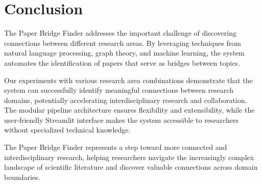 \documentclass[11pt,a4paper]{article}
\begin{document}
\section{Conclusion}

The Paper Bridge Finder addresses the important challenge of discovering connections between different research areas. By leveraging techniques from natural language processing, graph theory, and machine learning, the system automates the identification of papers that serve as bridges between topics.

Our experiments with various research area combinations demonstrate that the system can successfully identify meaningful connections between research domains, potentially accelerating interdisciplinary research and collaboration. The modular pipeline architecture ensures flexibility and extensibility, while the user-friendly Streamlit interface makes the system accessible to researchers without specialized technical knowledge.

The Paper Bridge Finder represents a step toward more connected and interdisciplinary research, helping researchers navigate the increasingly complex landscape of scientific literature and discover valuable connections across domain boundaries.

\end{document}

